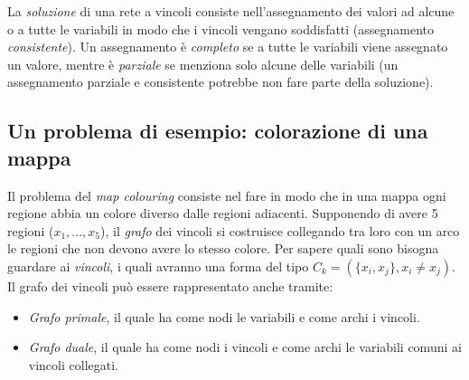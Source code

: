\documentclass[11pt,oneside]{book}
\begin{document}
La \textit{soluzione} di una rete a vincoli consiste nell'assegnamento dei valori ad alcune o a tutte le variabili in modo che i vincoli vengano soddisfatti (assegnamento \textit{consistente}). Un assegnamento è \textit{completo} se a tutte le variabili viene assegnato un valore, mentre è \textit{parziale} se menziona solo alcune delle variabili (un assegnamento parziale e consistente potrebbe non fare parte della soluzione).

\subsection{Un problema di esempio: colorazione di una mappa}
Il problema del \textit{map colouring} consiste nel fare in modo che in una mappa ogni regione abbia un colore diverso dalle regioni adiacenti. Supponendo di avere 5 regioni ($x_1, ..., x_5$), il \textit{grafo} dei vincoli si costruisce collegando tra loro con un arco le regioni che non devono avere lo stesso colore. Per sapere quali sono bisogna guardare ai \textit{vincoli}, i quali avranno una forma del tipo $C_k = (\{ x_i, x_j \}, x_i \neq x_j)$. Il grafo dei vincoli può essere rappresentato anche tramite:
\begin{itemize}
    \item \textit{Grafo primale}, il quale ha come nodi le variabili e come archi i vincoli.
    \item \textit{Grafo duale}, il quale ha come nodi i vincoli e come archi le variabili comuni ai vincoli collegati.
\end{itemize}
\end{document}
